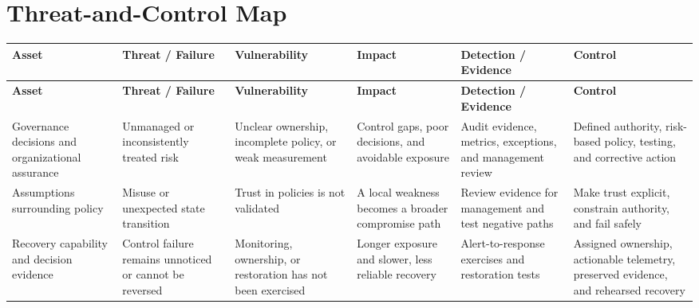 \documentclass[11pt,letterpaper]{article}
\begin{document}
\section*{Threat-and-Control Map}
\begingroup\scriptsize\setlength{\tabcolsep}{2pt}
\begin{longtable}{>{\raggedright\arraybackslash}p{}>{\raggedright\arraybackslash}p{}>{\raggedright\arraybackslash}p{}>{\raggedright\arraybackslash}p{}>{\raggedright\arraybackslash}p{}>{\raggedright\arraybackslash}p{}}
\toprule\rowcolor{Navy}\color{white}\textbf{Asset} & \color{white}\textbf{Threat / Failure} & \color{white}\textbf{Vulnerability} & \color{white}\textbf{Impact} & \color{white}\textbf{Detection / Evidence} & \color{white}\textbf{Control}\\\midrule
\endfirsthead
\toprule\rowcolor{Navy}\color{white}\textbf{Asset} & \color{white}\textbf{Threat / Failure} & \color{white}\textbf{Vulnerability} & \color{white}\textbf{Impact} & \color{white}\textbf{Detection / Evidence} & \color{white}\textbf{Control}\\\midrule
\endhead
Governance decisions and organizational assurance & Unmanaged or inconsistently treated risk & Unclear ownership, incomplete policy, or weak measurement & Control gaps, poor decisions, and avoidable exposure & Audit evidence, metrics, exceptions, and management review & Defined authority, risk-based policy, testing, and corrective action\\\midrule
Assumptions surrounding policy & Misuse or unexpected state transition & Trust in policies is not validated & A local weakness becomes a broader compromise path & Review evidence for management and test negative paths & Make trust explicit, constrain authority, and fail safely\\\midrule
Recovery capability and decision evidence & Control failure remains unnoticed or cannot be reversed & Monitoring, ownership, or restoration has not been exercised & Longer exposure and slower, less reliable recovery & Alert-to-response exercises and restoration tests & Assigned ownership, actionable telemetry, preserved evidence, and rehearsed recovery\\\midrule
\bottomrule
\end{longtable}
\endgroup
\end{document}
